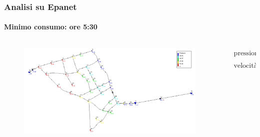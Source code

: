 \documentclass{beamer}
\begin{document}
%
\begin{frame}
	\frametitle{Analisi su Epanet}
	\framesubtitle{Minimo consumo: ore 5:30}
	\begin{columns}
		\begin{column}{.7\textwidth}
				\begin{figure}
					\centering
					\includegraphics[width=\linewidth]{images/pressure_min_demand}
				\end{figure}
		\end{column}
%
		\begin{column}{.3\textwidth}
			\begin{align*}
				&\text{pressioni} \in [15, 70]\,m\\
				&\text{velocit\`a} < 2\,\dfrac{m}{s}
			\end{align*}
		\end{column}
	\end{columns}
\end{frame}
%
%
%
\end{document}
